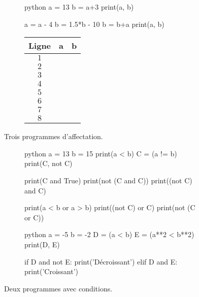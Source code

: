\begin{figure}[h]
\begin{subfigure}{.5\textwidth}
\vspace{15pt}
\begin{mintedbox}{python}
a = 13
b = a+3
print(a, b)

a = a - 4
b = 1.5*b - 10
b = b+a
print(a, b)
\end{mintedbox}
\end{subfigure}
\hfill
\begin{subfigure}{.45\textwidth}
	\begin{tabular}{|c|c|c|}\hline
		Ligne & a & b \\ \hline
		$1$ && \\ \hline
		$2$ && \\ \hline
		$3$ && \\ \hline
		$4$ && \\ \hline
		$5$ && \\ \hline
		$6$ && \\ \hline
		$7$ && \\ \hline
		$8$ && \\ \hline
	\end{tabular}
\end{subfigure}

\caption{Trois programmes d'affectation.}
\label{fig:1}
\end{figure}


\begin{figure}[h]
\begin{subfigure}{.5\textwidth}
\vspace{15pt}
\begin{mintedbox}{python}
a = 13
b = 15
print(a < b)
C = (a != b)
print(C, not C)

print(C and True)
print(not (C and C))
print((not C) and C)

print(a < b or a > b)
print((not C) or C)
print(not (C or C))
\end{mintedbox}
\end{subfigure}
\hfill
\begin{subfigure}{.45\textwidth}
\begin{mintedbox}{python}
a = -5
b = -2
D = (a < b)
E = (a**2 < b**2)
print(D, E)

if D and not E:
	print('Décroissant')
elif D and E:
	print('Croissant')
\end{mintedbox}
\end{subfigure}

\caption{Deux programmes avec conditions.}
\label{fig:3}
\end{figure}

